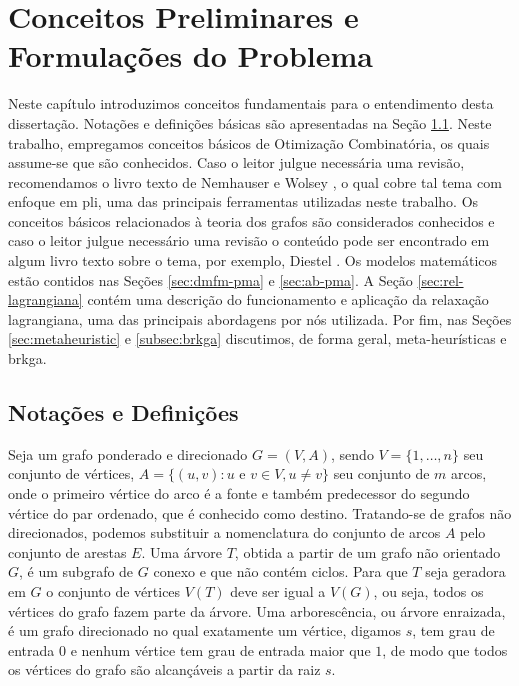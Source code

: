 \chapter{Conceitos Preliminares e Formulações do Problema} \label{chp:preliminares}

Neste capítulo introduzimos conceitos fundamentais para o entendimento
desta dissertação.  Notações e  definições básicas são apresentadas na
Seção  \ref{sec:not-e-def}.   Neste   trabalho,  empregamos  conceitos
básicos  de  Otimização  Combinatória,  os  quais  assume-se  que  são
conhecidos. Caso o leitor  julgue necessária uma revisão, recomendamos
o livro texto de Nemhauser e Wolsey \cite{Nemhauser}, o qual cobre tal
tema  com  enfoque  em   \gls{pli},  uma  das  principais  ferramentas
utilizadas neste trabalho.  Os conceitos básicos relacionados à teoria
dos  grafos  são  considerados  conhecidos  e  caso  o  leitor  julgue
necessário uma revisão  o conteúdo pode ser encontrado  em algum livro
texto  sobre o  tema,  por exemplo,  Diestel \cite{diestel:2005}.   Os
modelos  matemáticos estão  contidos nas  Seções \ref{sec:dmfm-pma}  e
\ref{sec:ab-pma}.   A   Seção  \ref{sec:rel-lagrangiana}   contém  uma
descrição do  funcionamento e aplicação da  relaxação lagrangiana, uma
das  principais abordagens  por nós  utilizada.  Por  fim, nas  Seções
\ref{sec:metaheuristic}  e  \ref{subsec:brkga}  discutimos,  de  forma
geral, meta-heurísticas e \gls{brkga}.

\section{Notações e Definições} \label{sec:not-e-def}

Seja um grafo  ponderado e direcionado $G  = (V, A)$, sendo  $V = \{1,
\dots, n\}$ seu conjunto  de vértices, $A = \{(u, v) : u  \text{ e } v
\in V, u \neq v\}$ seu conjunto  de $m$ arcos, onde o primeiro vértice
do  arco é  a fonte  e também  predecessor do  segundo vértice  do par
ordenado, que  é conhecido  como destino.   Tratando-se de  grafos não
direcionados, podemos  substituir a nomenclatura do  conjunto de arcos
$A$ pelo conjunto  de arestas $E$. Uma árvore $T$,  obtida a partir de
um grafo  não orientado  $G$, é um  subgrafo de $G$  conexo e  que não
contém  ciclos. Para  que  $T$  seja geradora  em  $G$  o conjunto  de
vértices $V(T)$ deve ser igual a $V(G)$, ou seja, todos os vértices do
grafo fazem parte da árvore. Uma arborescência, ou árvore enraizada, é
um grafo direcionado  no qual exatamente um vértice,  digamos $s$, tem
grau de  entrada $0$ e  nenhum vértice tem  grau de entrada  maior que
$1$, de modo  que todos os vértices do grafo  são alcançáveis a partir
da raiz $s$.

